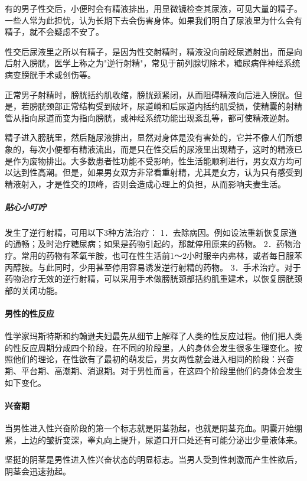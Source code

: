 有的男子性交后，小便时会有精液排出，用显微镜检查其尿液，可见大量的精子。一些人常为此担忧，认为长期下去会伤害身体。如果我们明白了尿液里为什么会有精子，就不会疑虑不安了。

性交后尿液里之所以有精子，是因为性交射精时，精液没向前经尿道射出，而是向后射入膀胱，医学上称之为"逆行射精"，常见于前列腺切除术，糖尿病伴神经系统病变膀胱手术或创伤等。

正常男子射精时，膀胱括约肌收缩，膀胱颈紧闭，从而阻碍精液向后进入膀胱。但是，若膀胱颈部正常结构受到破坏，尿道嵴和后尿道内括约肌受损，使精囊的射精管从指向尿道而变为指向膀胱，或神经系统功能出现紊乱等，都可使精液逆射。

精子进入膀胱里，然后随尿液排出，显然对身体是没有害处的，它并不像人们所想象的，每次小便都有精液流出，而是只在性交后的尿液里出现精子，这时的精液已是作为废物排出。大多数患者性功能不受影响，性生活能顺利进行，男女双方均可以达到性高潮。但是，如果男女双方非常看重射精，尤其是女方，认为只有感受到精液射入，才是性交的顶峰，否则会造成心理上的负担，从而影响夫妻生活。

\subparagraph{贴心小叮咛}

发生了逆行射精，可用以下3种方法治疗：
1．去除病因。例如设法重新恢复尿道的通畅；及时治疗糖尿病；如果是药物引起的，那就停用原来的药物。
2．药物治疗。常用的药物有苯氧苄胺，也可在性生活前1～2小时服辛内弗林，或者每日服苯丙醇胺。与此同时，少用甚至停用容易诱发逆行射精的药物。
3．手术治疗。对于药物治疗无效的逆行射精，可以采用手术做膀胱颈部括约肌重建术，以恢复膀胱颈部的关闭功能。

\paragraph{男性的性反应}

性学家玛斯特斯和约翰逊夫妇最先从细节上解释了人类的性反应过程。他们把人类的性反应周期分成四个阶段，在不同的阶段里，人的身体会发生很多生理变化。按照他们的理论，在性欲有了最初的萌发后，男女两性就会进入相同的阶段：兴奋期、平台期、高潮期、消退期。对于男性而言，在这四个阶段里他们的身体会发生如下变化。

\paragraph{兴奋期}

当男性进入性兴奋阶段的第一个标志就是阴茎勃起，也就是阴茎充血。阴囊开始绷紧，上边的皱折变深，睾丸向上提升，尿道口开口处还有可能分泌出少量液体来。

坚挺的阴茎是男性进入性兴奋状态的明显标志。当男人受到性刺激而产生性欲后，阴茎会迅速勃起。

